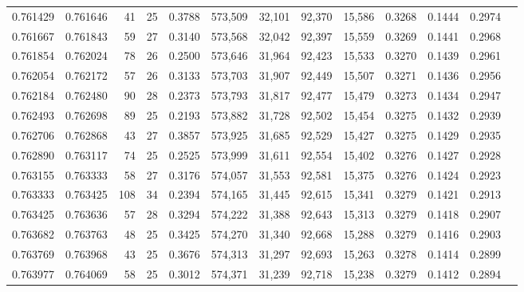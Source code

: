 \begin{tabular}{rrrrrrrrrrrrr}
0.761429 & 0.761646 &     41 &    25 &                                     0.3788 & 573,509 &  32,101 &  92,370 &  15,586 & 0.3268 & 0.1444 & 0.2974 \\
0.761667 & 0.761843 &     59 &    27 &                                     0.3140 & 573,568 &  32,042 &  92,397 &  15,559 & 0.3269 & 0.1441 & 0.2968 \\
0.761854 & 0.762024 &     78 &    26 &                                     0.2500 & 573,646 &  31,964 &  92,423 &  15,533 & 0.3270 & 0.1439 & 0.2961 \\
0.762054 & 0.762172 &     57 &    26 &                                     0.3133 & 573,703 &  31,907 &  92,449 &  15,507 & 0.3271 & 0.1436 & 0.2956 \\
0.762184 & 0.762480 &     90 &    28 &                                     0.2373 & 573,793 &  31,817 &  92,477 &  15,479 & 0.3273 & 0.1434 & 0.2947 \\
0.762493 & 0.762698 &     89 &    25 &                                     0.2193 & 573,882 &  31,728 &  92,502 &  15,454 & 0.3275 & 0.1432 & 0.2939 \\
0.762706 & 0.762868 &     43 &    27 &                                     0.3857 & 573,925 &  31,685 &  92,529 &  15,427 & 0.3275 & 0.1429 & 0.2935 \\
0.762890 & 0.763117 &     74 &    25 &                                     0.2525 & 573,999 &  31,611 &  92,554 &  15,402 & 0.3276 & 0.1427 & 0.2928 \\
0.763155 & 0.763333 &     58 &    27 &                                     0.3176 & 574,057 &  31,553 &  92,581 &  15,375 & 0.3276 & 0.1424 & 0.2923 \\
0.763333 & 0.763425 &    108 &    34 &                                     0.2394 & 574,165 &  31,445 &  92,615 &  15,341 & 0.3279 & 0.1421 & 0.2913 \\
0.763425 & 0.763636 &     57 &    28 &                                     0.3294 & 574,222 &  31,388 &  92,643 &  15,313 & 0.3279 & 0.1418 & 0.2907 \\
0.763682 & 0.763763 &     48 &    25 &                                     0.3425 & 574,270 &  31,340 &  92,668 &  15,288 & 0.3279 & 0.1416 & 0.2903 \\
0.763769 & 0.763968 &     43 &    25 &                                     0.3676 & 574,313 &  31,297 &  92,693 &  15,263 & 0.3278 & 0.1414 & 0.2899 \\
0.763977 & 0.764069 &     58 &    25 &                                     0.3012 & 574,371 &  31,239 &  92,718 &  15,238 & 0.3279 & 0.1412 & 0.2894 \\

\end{tabular}
